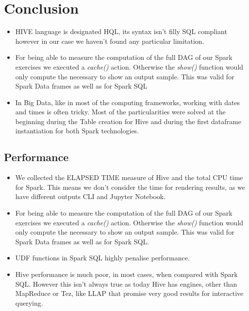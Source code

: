 \documentclass[conference,compsoc]{IEEEtran}
\begin{document}
\section{Conclusion}


\begin{itemize}
\item HIVE language is designated HQL, its syntax isn't filly SQL compliant however in our case we haven't found any particular limitation.
\item For being able to measure the computation of the full DAG of our Spark exercises we executed a \textit{cache()} action. Otherwise the \textit{show()} function would only compute the necessary to show an output sample. This was valid for Spark Data frames as well as for Spark SQL
\item In Big Data, like in most of the computing frameworks, working with dates and times is often tricky. Most of the particularities were solved at the beginning during the Table creation for Hive and during the first dataframe instantiation for both Spark technologies.

\end{itemize}

\subsection{Performance}
\begin{itemize}
\item We collected the ELAPSED TIME measure of Hive and the total CPU time for Spark. This means we don't consider the time for rendering results, as we have different outputs CLI and Jupyter Notebook.
\item For being able to measure the computation of the full DAG of our Spark exercises we executed a \textit{cache()} action. Otherwise the \textit{show()} function would only compute the necessary to show an output sample. This was valid for Spark Data frames as well as for Spark SQL.
\item UDF functions in Spark SQL highly penalise performance.
\item Hive performance is much poor, in most cases, when compared with Spark SQL. However this isn't always true as today Hive has engines, other than MapReduce or Tez, like LLAP that promise very good results for interactive querying.
\end{itemize}




\end{document}
